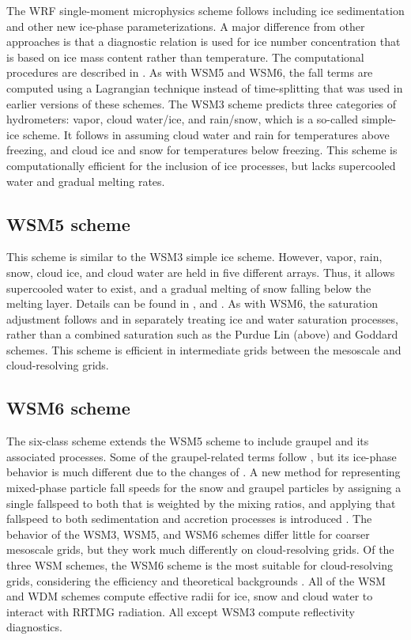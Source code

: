 The WRF single-moment microphysics scheme follows \citet{hong04} including ice sedimentation and other new ice-phase parameterizations. A major difference from other approaches is that a diagnostic relation is used for ice number concentration that is based on ice mass content rather than temperature. The computational procedures are described in \citet{honglim06}. As with WSM5 and WSM6, the fall terms are computed using a Lagrangian technique instead of time-splitting that was used in earlier versions of these schemes. The WSM3 scheme predicts three categories of hydrometers: vapor, cloud water/ice, and rain/snow, which is a so-called simple-ice scheme. It follows \citet{dudhia89} in assuming cloud water and rain for temperatures above freezing, and cloud ice and snow for temperatures below freezing. This scheme is computationally efficient for the inclusion of ice processes, but lacks supercooled water and gradual melting rates. 

\subsection{WSM5 scheme}

This scheme is similar to the WSM3 simple ice scheme. However, vapor, rain, snow, cloud ice,
and cloud water are held in five different arrays. Thus, it allows supercooled water to exist, and
a gradual melting of snow falling below the melting layer. Details can be found in 
\citet{hong04}, and \citet{honglim06}. As with WSM6, the saturation adjustment follows \citet{dudhia89} and \citet{hong98} in separately treating ice and water saturation processes, rather than a combined saturation such as the Purdue Lin (above) and Goddard \citep{tao89} schemes. This scheme is efficient in intermediate grids between the mesoscale and cloud-resolving grids.

\subsection{WSM6 scheme}

The six-class scheme extends the WSM5 scheme to include graupel and its associated processes.
Some of the graupel-related terms follow \citet{lin83}, but its ice-phase behavior is much different due to the changes of \citet{hong04}. A new method for representing mixed-phase particle fall speeds for the snow and graupel particles by assigning a single fallspeed to both that is weighted by the mixing ratios, and applying that fallspeed to both sedimentation and accretion processes is introduced \citep{dudhia08}. The behavior of the WSM3, WSM5, and WSM6 schemes differ little for coarser mesoscale grids, but they work much differently on cloud-resolving grids. Of the three WSM schemes, the WSM6 scheme is the most suitable for cloud-resolving grids, considering the efficiency and theoretical backgrounds \citep{honglim06}. All of the WSM and WDM schemes compute effective radii for ice, snow and cloud water to interact with RRTMG radiation. All except WSM3 compute reflectivity diagnostics.

